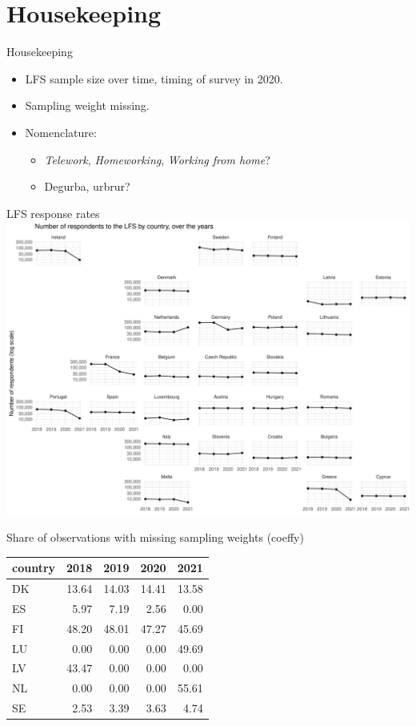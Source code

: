 \documentclass[10pt,handout]{beamer}
\begin{document}
\section{Housekeeping}
\begin{frame}{Housekeeping}
\begin{itemize}
  \item LFS sample size over time, timing of survey in 2020.
  \item Sampling weight missing.
  \item Nomenclature:
    \begin{itemize}
      \item \emph{Telework}, \emph{Homeworking}, \emph{Working from home}?
      \item Degurba, urbrur?
    \end{itemize}
\end{itemize}
\end{frame}

\begin{frame}{LFS response rates}
\centering
\includegraphics[width=\textwidth,height=0.9\textheight,keepaspectratio]{LFS_respondents_time.pdf}
\end{frame}


\begin{frame}{Share of observations with missing sampling weights (coeffy)}
\centering
\begin{table}[ht]
\centering
\begin{tabular}{lrrrr}
  \hline
  country & 2018 & 2019 & 2020 & 2021 \\ 
  \hline
  DK & 13.64 & 14.03 & 14.41 & 13.58 \\ 
  ES & 5.97 & 7.19 & 2.56 & 0.00 \\ 
  FI & 48.20 & 48.01 & 47.27 & 45.69 \\ 
  LU & 0.00 & 0.00 & 0.00 & 49.69 \\ 
  LV & 43.47 & 0.00 & 0.00 & 0.00 \\ 
  NL & 0.00 & 0.00 & 0.00 & 55.61 \\ 
  SE & 2.53 & 3.39 & 3.63 & 4.74 \\ 
  \hline
\end{tabular}
\end{table}
\end{frame}
\end{document}
